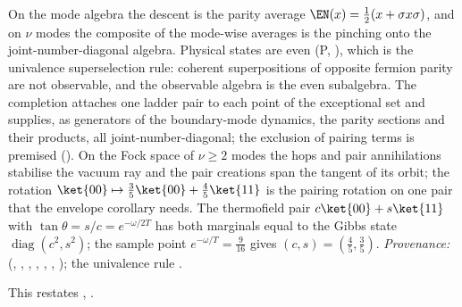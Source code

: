 On the mode algebra the descent is the parity average $\EN(x) = \tfrac12(x + \sigma x\sigma)$, and on $\nu$ modes the composite of the mode-wise averages is the pinching onto the joint-number-diagonal algebra. Physical states are even (P, ), which is the univalence superselection rule: coherent superpositions of opposite fermion parity are not observable, and the observable algebra is the even subalgebra. The completion attaches one ladder pair to each point of the exceptional set and supplies, as generators of the boundary-mode dynamics, the parity sections and their products, all joint-number-diagonal; the exclusion of pairing terms is premised (). On the Fock space of $\nu \geq 2$ modes the hops and pair annihilations stabilise the vacuum ray and the pair creations span the tangent of its orbit; the rotation $\ket{00} \mapsto \tfrac35\ket{00} + \tfrac45\ket{11}$ is the pairing rotation on one pair that the envelope corollary needs. The thermofield pair $c\ket{00} + s\ket{11}$ with $\tan\theta = s/c = e^{-\omega/2T}$ has both marginals equal to the Gibbs state $\operatorname{diag}(c^{2}, s^{2})$; the sample point $e^{-\omega/T} = \tfrac{9}{16}$ gives $(c, s) = (\tfrac45, \tfrac35)$. \emph{Provenance:} \cite[Thm.~5.7, Prop.~9.6, Prem.~7.8, Fact~7.9, Prem.~7.30, Thm.~C.8, Prop.~13.4, Cor.~11.6, Lem.~7.2, Thm.~7.27]{ButlerT5} (, , , , , , ); the univalence rule \cite{WWW1952}.

This restates , .

